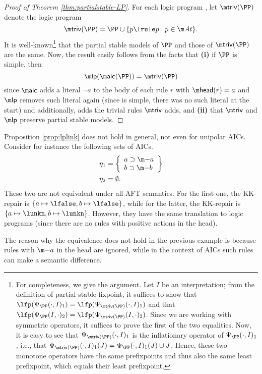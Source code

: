 

\begin{proof}[Proof of Theorem \ref{thm:partialstable-LP}]
 For each logic program \PP, let $\triv(\PP)$ denote the logic program 
 \[
  \triv(\PP) = \PP \cup \{p\lrule p\mid p\in \atoms\}.
 \]
 It is well-known\footnote{For completeness, we give the argument. Let $I$ be an interpretation; from the definition of partial stable fixpoint, it suffices to show that 
 $\lfp(\Psi_\PP(\cdot,I)_1)= \lfp(\Psi_{\triv(\PP)}(\cdot,I)_1)$ and that 
  $\lfp(\Psi_\PP(I,\cdot)_2)= \lfp(\Psi_{\triv(\PP)}(I,\cdot)_2)$. Since we are working with symmetric operators, it suffices to prove the first of the two equalities. 
  Now, it is easy to see that $\Psi_{\triv(\PP)}(\cdot,I)_1$ is the inflationary operator of $\Psi_\PP(\cdot,I)_1$, i.e., that $\Psi_{\triv(\PP)}(\cdot,I)_1(J) = \Psi_\PP(\cdot,I)_1(J)\cup J$. Hence, these two monotone operators have the same prefixpoints and thus also the same least prefixpoint, which equals their least prefixpoint. 
  }
 that the partial stable models of $\PP$ and those of $\triv(\PP)$ are the same. 
 Now, the result easily follows from the facts that \textbf{(i)} if $\PP$ is simple, then
\[
\lpop(\aicop(\PP)) = \triv(\PP)\]
since $\aicop$ adds a literal $\lnot a$ to the body of each rule $r$ with $\head(r) = a$ and $\lpop$ removes such literal again (since \PP is simple, there was no such literal at the start) and additionally, adds the trivial rules $\triv$ adds, and \textbf{(ii)} 
 that $\triv$ and $\lpop$ preserve partial stable models. 
% 
\end{proof}


\begin{example}
 Proposition \ref{prop:lplink} does not hold in general, not even for unipolar AICs. 
 Consider for instance the following sets of AICs. 
 \begin{align*}\eta_1 &= \left\{\begin{array}{l}
                    a \aicrule \remove a\\
                     b  \aicrule \remove b
                   \end{array}\right\}\\
                   \eta_2 &=\emptyset.
\end{align*}
These two are not equivalent under all AFT semantics. 
For the first one, the KK-repair is $\{a\mapsto\lfalse,b\mapsto\lfalse\}$, while for the latter, the KK-repair is $\{a\mapsto\lunkn,b\mapsto\lunkn\}$. However, they have the same translation to logic programs (since there are no rules with positive actions in the head).          
%                    
% 
\end{example}

The reason why the equivalence does not hold in the previous example is because rules with $\remove a$ in the head are ignored, while in the context of AICs such rules can make a semantic difference. 

